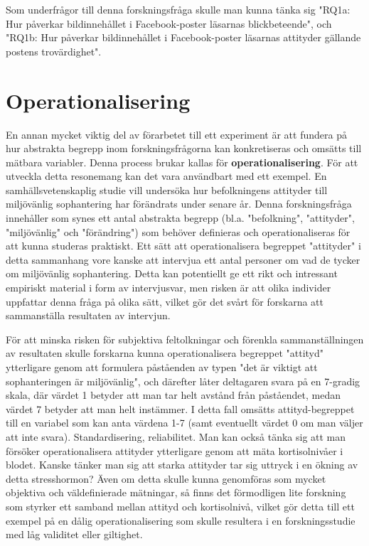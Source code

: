 \documentclass[
]{book}
\begin{document}
Som underfrågor till denna forskningsfråga skulle man kunna tänka sig "RQ1a: Hur påverkar bildinnehållet i Facebook-poster läsarnas blickbeteende", och "RQ1b: Hur påverkar bildinnehållet i Facebook-poster läsarnas attityder gällande postens trovärdighet".

\hypertarget{sec06.2}{%
\section{Operationalisering}\label{sec06.2}}

En annan mycket viktig del av förarbetet till ett experiment är att fundera på hur abstrakta begrepp inom forskningsfrågorna kan konkretiseras och omsätts till mätbara variabler. Denna process brukar kallas för \textbf{operationalisering}. För att utveckla detta resonemang kan det vara användbart med ett exempel. En samhällsvetenskaplig studie vill undersöka hur befolkningens attityder till miljövänlig sophantering har förändrats under senare år. Denna forskningsfråga innehåller som synes ett antal abstrakta begrepp (bl.a. "befolkning", "attityder", "miljövänlig" och "förändring") som behöver definieras och operationaliseras för att kunna studeras praktiskt. Ett sätt att operationalisera begreppet "attityder" i detta sammanhang vore kanske att intervjua ett antal personer om vad de tycker om miljövänlig sophantering. Detta kan potentiellt ge ett rikt och intressant empiriskt material i form av intervjusvar, men risken är att olika individer uppfattar denna fråga på olika sätt, vilket gör det svårt för forskarna att sammanställa resultaten av intervjun.

För att minska risken för subjektiva feltolkningar och förenkla sammanställningen av resultaten skulle forskarna kunna operationalisera begreppet "attityd" ytterligare genom att formulera påståenden av typen "det är viktigt att sophanteringen är miljövänlig", och därefter låter deltagaren svara på en 7-gradig skala, där värdet 1 betyder att man tar helt avstånd från påståendet, medan värdet 7 betyder att man helt instämmer. I detta fall omsätts attityd-begreppet till en variabel som kan anta värdena 1-7 (samt eventuellt värdet 0 om man väljer att inte svara). Standardisering, reliabilitet. Man kan också tänka sig att man försöker operationalisera attityder ytterligare genom att mäta kortisolnivåer i blodet. Kanske tänker man sig att starka attityder tar sig uttryck i en ökning av detta stresshormon? Även om detta skulle kunna genomföras som mycket objektiva och väldefinierade mätningar, så finns det förmodligen lite forskning som styrker ett samband mellan attityd och kortisolnivå, vilket gör detta till ett exempel på en dålig operationalisering som skulle resultera i en forskningsstudie med låg validitet eller giltighet.
\end{document}
